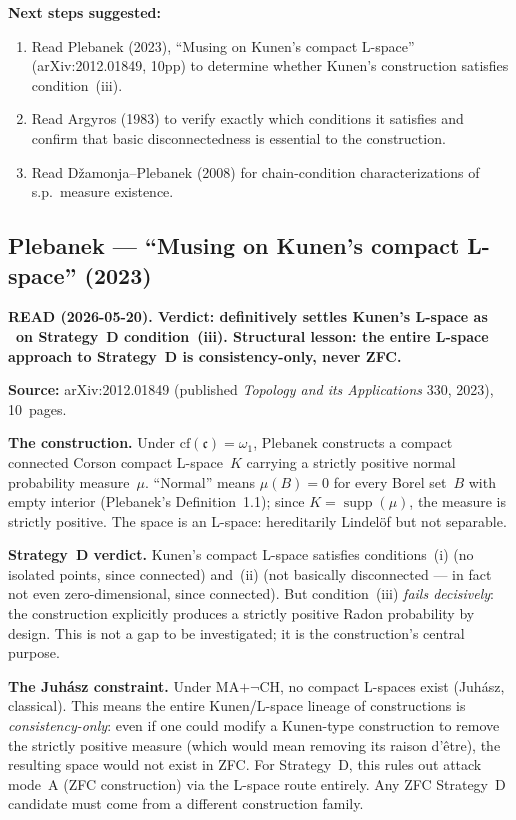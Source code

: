 \medskip\noindent
\textbf{Next steps suggested:}
\begin{enumerate}[nosep]
  \item Read Plebanek (2023), ``Musing on Kunen's compact L-space''
    (arXiv:2012.01849, 10pp) to determine whether Kunen's construction
    satisfies condition~(iii).
  \item Read Argyros (1983) to verify exactly which conditions it
    satisfies and confirm that basic disconnectedness is essential to
    the construction.
  \item Read D\v{z}amonja--Plebanek (2008) for chain-condition
    characterizations of s.p.\ measure existence.
\end{enumerate}

\subsection*{Plebanek --- ``Musing on Kunen's compact L-space''
(2023)}

\textbf{READ (2026-05-20).  Verdict: definitively settles Kunen's
L-space as \texttimes\ on Strategy~D condition~(iii).  Structural
lesson: the entire L-space approach to Strategy~D is
consistency-only, never ZFC.}

\medskip\noindent
\textbf{Source:} arXiv:2012.01849 (published \emph{Topology and its
Applications} 330, 2023), 10~pages.

\medskip\noindent
\textbf{The construction.}  Under $\mathrm{cf}(\mathfrak{c}) =
\omega_1$, Plebanek constructs a compact connected Corson compact
L-space~$K$ carrying a strictly positive normal probability
measure~$\mu$.  ``Normal'' means $\mu(B) = 0$ for every Borel
set~$B$ with empty interior (Plebanek's Definition~1.1); since
$K = \operatorname{supp}(\mu)$, the measure is strictly positive.
The space is an L-space: hereditarily Lindel\"{o}f but not separable.

\medskip\noindent
\textbf{Strategy~D verdict.}  Kunen's compact L-space satisfies
conditions~(i) (no isolated points, since connected) and~(ii) (not
basically disconnected --- in fact not even zero-dimensional, since
connected).  But condition~(iii) \emph{fails decisively}: the
construction explicitly produces a strictly positive Radon probability
by design.  This is not a gap to be investigated; it is the
construction's central purpose.

\medskip\noindent
\textbf{The Juh\'{a}sz constraint.}  Under MA$+\neg$CH, no compact
L-spaces exist (Juh\'{a}sz, classical).  This means the entire
Kunen/L-space lineage of constructions is \emph{consistency-only}:
even if one could modify a Kunen-type construction to remove the
strictly positive measure (which would mean removing its raison
d'\^{e}tre), the resulting space would not exist in ZFC\@.  For
Strategy~D, this rules out attack mode~A (ZFC construction) via the
L-space route entirely.  Any ZFC Strategy~D candidate must come from
a different construction family.

